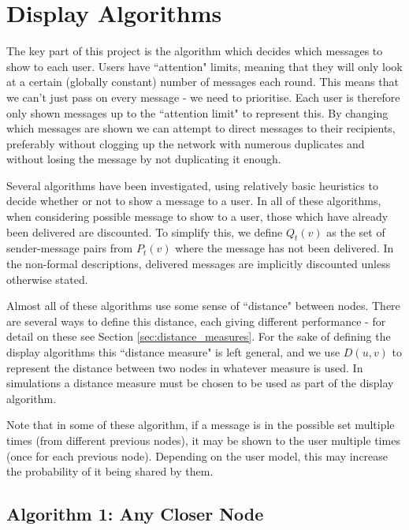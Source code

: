 \documentclass[bsc,frontabs,twoside,singlespacing,parskip,deptreport]{infthesis}     %
\begin{document}
\section{Display Algorithms} \label{sec:display_algorithms}
The key part of this project is the algorithm which decides which messages to show to each user. Users have ``attention" limits, meaning that they will only look at a certain (globally constant) number of messages each round. This means that we can't just pass on every message - we need to prioritise. Each user is therefore only shown messages up to the ``attention limit" to represent this. By changing which messages are shown we can attempt to direct messages to their recipients, preferably without clogging up the network with numerous duplicates and without losing the message by not duplicating it enough.

Several algorithms have been investigated, using relatively basic heuristics to decide whether or not to show a message to a user. In all of these algorithms, when considering possible message to show to a user, those which have already been delivered are discounted. To simplify this, we define $Q_{t}(v)$ as the set of sender-message pairs from $P_{t}(v)$ where the message has not been delivered. In the non-formal descriptions, delivered messages are implicitly discounted unless otherwise stated.

Almost all of these algorithms use some sense of ``distance" between nodes. There are several ways to define this distance, each giving different performance - for detail on these see Section \ref{sec:distance_measures}. For the sake of defining the display algorithms this ``distance measure" is left general, and we use $D(u, v)$ to represent the distance between two nodes in whatever measure is used. In simulations a distance measure must be chosen to be used as part of the display algorithm.

Note that in some of these algorithm, if a message is in the possible set multiple times (from different previous nodes), it may be shown to the user multiple times (once for each previous node). Depending on the user model, this may increase the probability of it being shared by them.

\subsection{Algorithm 1: Any Closer Node}
\end{document}
